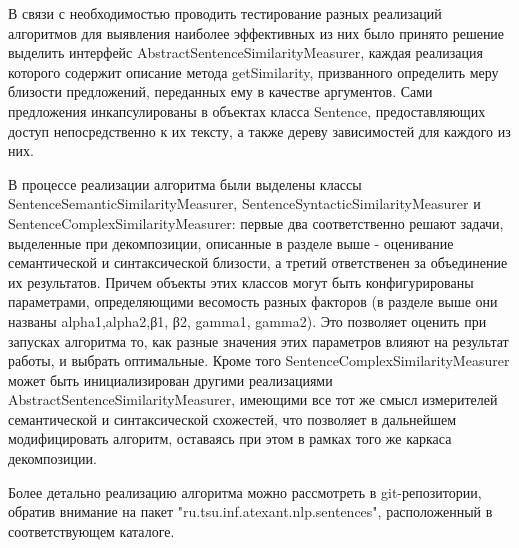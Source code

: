 

В связи с необходимостью проводить тестирование разных реализаций алгоритмов
для выявления наиболее эффективных из них было принято решение выделить интерфейс
AbstractSentenceSimilarityMeasurer, каждая реализация которого содержит описание метода getSimilarity,
призванного определить меру близости предложений, переданных ему в качестве аргументов.
Сами предложения инкапсулированы в объектах класса Sentence, предоставляющих доступ
непосредственно к их тексту, а также дереву зависимостей для каждого из них.


В процессе реализации алгоритма были выделены классы SentenceSemanticSimilarityMeasurer,
SentenceSyntacticSimilarityMeasurer и SentenceComplexSimilarityMeasurer:
первые два соответственно решают задачи, выделенные при декомпозиции, описанные
в разделе выше - оценивание семантической и синтаксической близости,
а третий ответственен за объединение их результатов. Причем объекты этих классов
могут быть конфигурированы параметрами, определяющими весомость разных факторов
(в разделе выше они названы alpha1,alpha2,β1, β2, gamma1, gamma2).
Это позволяет оценить при запусках алгоритма то, как разные значения этих параметров влияют на результат работы,
и выбрать оптимальные. Кроме того SentenceComplexSimilarityMeasurer может быть инициализирован 
другими реализациями AbstractSentenceSimilarityMeasurer, имеющими все тот же смысл
измерителей семантической и синтаксической схожестей, что позволяет в дальнейшем модифицировать алгоритм,
оставаясь при этом в рамках того же каркаса декомпозиции. 

Более детально реализацию алгоритма можно рассмотреть в git-репозитории\cite{github},
обратив внимание на пакет "ru.tsu.inf.atexant.nlp.sentences",
расположенный в соответствующем каталоге.




